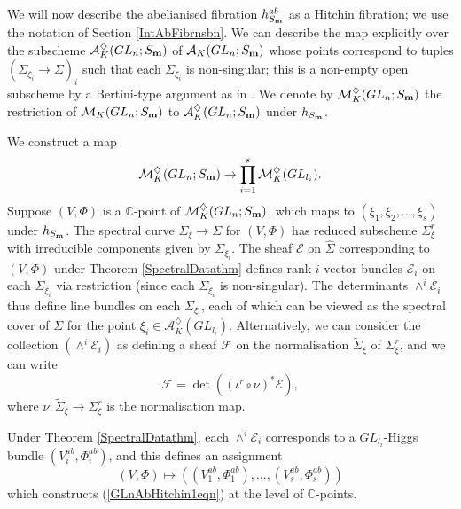 \documentclass{amsart}
\theoremstyle{remark}
\numberwithin{theorem}{section}
\numberwithin{equation}{section}
\begin{document}
We will now describe the abelianised fibration $h_{S_{\bf m}}^{ab}$ as a Hitchin fibration; we use the notation of Section \ref{IntAbFibrnsbn}. We can describe the map explicitly over the subscheme $\mathcal A^\diamondsuit_K(GL_n;S_{\bf m})$ of $\mathcal A_K(GL_n;S_{\bf m})$ whose points correspond to tuples $({\Sigma}_{\xi_i} \rightarrow \Sigma)_i$ such that each ${\Sigma}_{\xi_i}$ is non-singular; this is a non-empty open subscheme by a Bertini-type argument as in \cite[Section 5.1]{Hitchin2}. We denote by $\mathcal M^\diamondsuit_K(GL_n;S_{\bf m})$ the restriction of $\mathcal M_K(GL_n;S_{\bf m})$ to $\mathcal A^\diamondsuit_K(GL_n;S_{\bf m})$ under $h_{S_{\bf m}}$. 

We construct a map
\begin{equation}\label{GLnAbHitchin1eqn}
    \mathcal M^\diamondsuit_K(GL_n;S_{\bf m})\rightarrow \prod_{i=1}^s\mathcal M_K^\diamondsuit(GL_{l_i}).
\end{equation}
 Suppose $(V,\Phi)$ is a $\mathbb{C}$-point of $\mathcal M^\diamondsuit_K(GL_n;S_{\bf m})$, which maps to $(\xi_1,\xi_2,...,\xi_s)$ under $h_{S_{\bf m}}$. The spectral curve ${\Sigma}_\xi \rightarrow \Sigma$ for $(V,\Phi)$ has reduced subscheme ${\Sigma}_\xi^r$ with irreducible components given by ${\Sigma}_{\xi_i}$. The sheaf $\mathcal E$ on $\hat{\Sigma}$ corresponding to $(V,\Phi)$ under Theorem \ref{SpectralDatathm} defines rank $i$ vector bundles $\mathcal E_i$ on each ${\Sigma}_{\xi_i}$ via restriction (since each ${\Sigma}_{\xi_i}$ is non-singular). The determinants $\wedge^i \mathcal E_i$ thus define line bundles on each ${\Sigma}_{\xi_i}$, each of which can be viewed as the spectral cover of $\Sigma$ for the point $\xi_i \in \mathcal A^\diamondsuit_K(GL_{l_i})$. Alternatively, we can consider the collection $(\wedge^i\mathcal E_i)$ as defining a sheaf $\mathcal F$ on the normalisation $\tilde{\Sigma}_\xi$ of ${\Sigma}_\xi^r$, and we can write
\begin{equation}\label{NormalisedSpectralDataeqn}
    \mathcal F = \det((\iota^r \circ \nu)^*\mathcal E),
\end{equation}
where $\nu:\tilde{\Sigma}_\xi \rightarrow {\Sigma}_\xi^r$ is the normalisation map.

Under Theorem \ref{SpectralDatathm}, each $\wedge^i\mathcal E_i$ corresponds to a $GL_{l_i}$-Higgs bundle $(V_i^{ab},\Phi_i^{ab})$, and this defines an assignment
\begin{equation}\label{GLnAbHitchin2eqn}
    (V,\Phi) \mapsto ((V_1^{ab},\Phi_1^{ab}),...,(V_s^{ab},\Phi_s^{ab}))
\end{equation}
which constructs (\ref{GLnAbHitchin1eqn}) at the level of $\mathbb{C}$-points.
\end{document}
